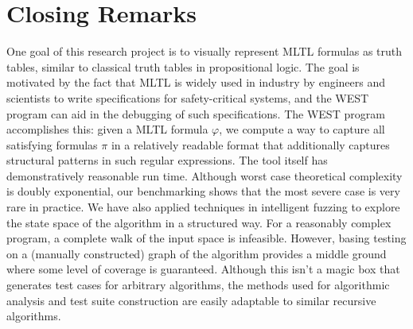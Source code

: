 \documentclass[runningheads]{llncs}
\renewcommand{\phi}{\varphi}
\begin{document}
\section{Closing Remarks}
\label{Conclusion}
 One goal of this research project is to visually represent MLTL formulas as truth tables, similar to classical truth tables in propositional logic. 
The goal is motivated by the fact that MLTL is widely used in industry by engineers and scientists to write specifications for safety-critical systems, and the WEST program can aid in the debugging of such specifications. 
The WEST program accomplishes this: given a MLTL formula $\phi$, we compute a way to capture all satisfying formulas $\pi$ in a relatively readable format that additionally captures structural patterns in such regular expressions. 
The tool itself has demonstratively reasonable run time. 
Although worst case theoretical complexity is doubly exponential, our benchmarking shows that the most severe case is very rare in practice. 
We have also applied techniques in intelligent fuzzing to explore the state space of the algorithm in a structured way. 
For a reasonably complex program, a complete walk of the input space is infeasible. 
However, basing testing on a (manually constructed) graph of the algorithm provides a middle ground where some level of coverage is guaranteed. 
Although this isn't a magic box that generates test cases for arbitrary algorithms, the methods used for algorithmic analysis and test suite construction are easily adaptable to similar recursive algorithms.
\end{document}
